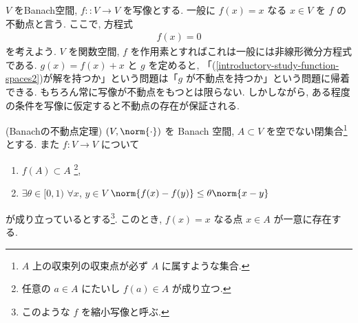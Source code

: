 \documentclass[openany, a4paper, oneside]{jsbook}
\begin{document}
$V$ をBanach空間, $f \colon :V \to V$ を写像とする.
一般に $f(x)=x$ なる $x\in V$ を $f$ の不動点と言う.
ここで, 方程式
\begin{align}
 f(x)=0 \label{introductory-study-function-spaces2}
\end{align}
を考えよう.
$V$ を関数空間, $f$ を作用素とすればこれは一般には非線形微分方程式である.
$g(x) = f(x) + x$ と $g$ を定めると, 「(\ref{introductory-study-function-spaces2})が解を持つか」という問題は「$g$ が不動点を持つか」という問題に帰着できる.
もちろん常に写像が不動点をもつとは限らない.
しかしながら, ある程度の条件を写像に仮定すると不動点の存在が保証される.
\begin{thm}(Banachの不動点定理)
 $(V, \norm{\cdot})$ を Banach 空間, $A \subset V$ を空でない閉集合\footnote{$A$ 上の収束列の収束点が必ず $A$ に属すような集合.}とする.
 また $f \colon V\to V$ について
\begin{enumerate}
\item $f(A) \subset A$ \footnote{任意の $a\in A$ にたいし $f(a)\in A$ が成り立つ.},
\item $\exists \theta \in[0, 1)$ $\forall x$, $y \in V$ $\norm{f(x)-f(y)} \leq \theta \norm{x - y}$
\end{enumerate}
が成り立っているとする\footnote{このような $f$ を縮小写像と呼ぶ.}.
このとき, $f(x) = x$ なる点 $x \in A$ が一意に存在する.
\end{thm}
\end{document}
